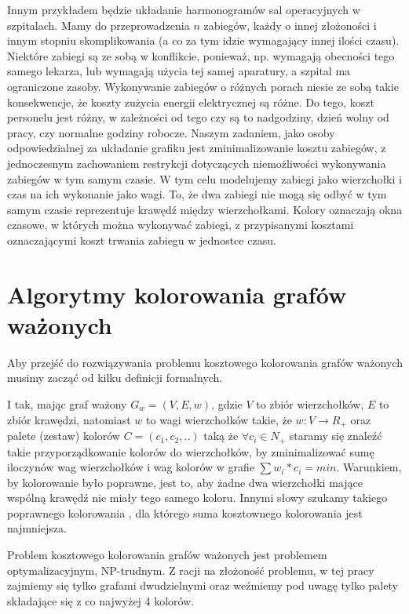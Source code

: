 \documentclass{article}
\begin{document}
Innym przykładem będzie układanie harmonogramów sal operacyjnych w szpitalach. Mamy do przeprowadzenia $n$ zabiegów, każdy o innej złożoności i innym stopniu skomplikowania (a co za tym idzie wymagający innej ilości czasu). Niektóre zabiegi są ze sobą w konflikcie, ponieważ, np. wymagają obecności tego samego lekarza, lub wymagają użycia tej samej aparatury, a szpital ma ograniczone zasoby. Wykonywanie zabiegów o różnych porach niesie ze sobą takie konsekwencje, że koszty zużycia energii elektrycznej są różne. Do tego, koszt personelu jest różny, w zależności od tego czy są to nadgodziny, dzień wolny od pracy, czy normalne godziny robocze. Naszym zadaniem, jako osoby odpowiedzialnej za układanie grafiku jest zminimalizowanie kosztu zabiegów, z jednoczesnym zachowaniem restrykcji dotyczących niemożliwości wykonywania zabiegów w tym samym czasie. W tym celu modelujemy zabiegi jako wierzchołki i czas na ich wykonanie jako wagi. To, że dwa zabiegi nie mogą się odbyć w tym samym czasie reprezentuje krawędź między wierzchołkami. Kolory oznaczają okna czasowe, w których można wykonywać zabiegi, z przypisanymi kosztami oznaczającymi koszt trwania zabiegu w jednostce czasu.

\section{Algorytmy kolorowania grafów ważonych}

Aby przejść do rozwiązywania problemu kosztowego kolorowania grafów ważonych musimy zacząć od kilku definicji formalnych. 

I tak, mając graf ważony $G_w = (V,E,w)$, gdzie $V$ to zbiór wierzchołków, $E$ to zbiór krawędzi, natomiast $w$ to wagi wierzchołków takie, że  $w:V \rightarrow R_+$ oraz palete (zestaw) kolorów $C = (c_1, c_2, ..)$ taką że $\forall c_i \in N_+$ staramy się znaleźć takie przyporządkowanie kolorów do wierzchołków, by zminimalizować sumę iloczynów wag wierzchołków i wag kolorów w grafie $\sum w_i * c_i = min$. Warunkiem, by kolorowanie było poprawne, jest to, aby żadne dwa wierzchołki mające wspólną krawędź nie miały tego samego koloru. Innymi słowy szukamy takiego poprawnego kolorowania , dla którego suma kosztownego kolorowania jest najmniejsza.

Problem kosztowego kolorowania grafów ważonych jest problemem optymalizacyjnym, NP-trudnym. Z racji na złożoność problemu, w tej pracy zajmiemy się tylko grafami dwudzielnymi oraz weźmiemy pod uwagę tylko palety składające się z co najwyżej 4 kolorów.
\end{document}
